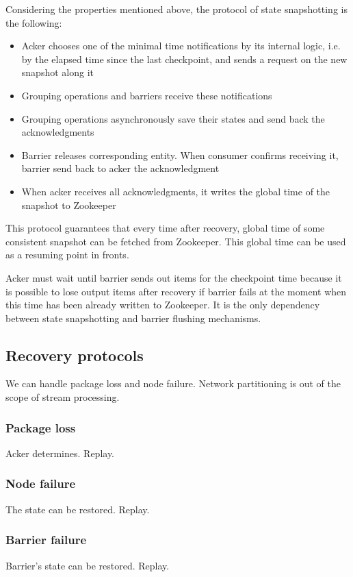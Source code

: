Considering the properties mentioned above, the protocol of state snapshotting is the following:

\begin{itemize}
    \item Acker chooses one of the minimal time notifications by its internal logic, i.e. by the elapsed time since the last checkpoint, and sends a request on the new snapshot along it
    \item Grouping operations and barriers receive these notifications
    \item Grouping operations asynchronously save their states and send back the acknowledgments
    \item Barrier releases corresponding entity. When consumer confirms receiving it, barrier send back to acker the acknowledgment
    \item When acker receives all acknowledgments, it writes the global time of the snapshot to Zookeeper 
\end{itemize}

This protocol guarantees that every time after recovery, global time of some consistent snapshot can be fetched from Zookeeper. This global time can be used as a resuming point in fronts. 

Acker must wait until barrier sends out items for the checkpoint time because it is possible to lose output items after recovery if barrier fails at the moment when this time has been already written to Zookeeper. It is the only dependency between state snapshotting and barrier flushing mechanisms. 

\subsection{Recovery protocols}
We can handle package loss and node failure. Network partitioning is out of the scope of stream processing.

\subsubsection{Package loss}
Acker determines. Replay.

\subsubsection{Node failure}
The state can be restored. Replay.

\subsubsection{Barrier failure}
Barrier's state can be restored. Replay.